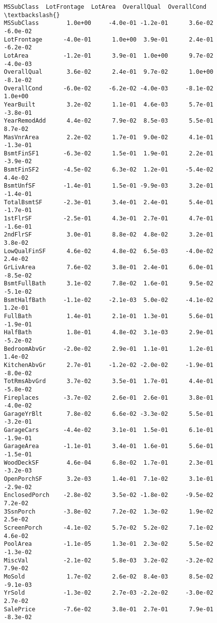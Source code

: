\documentclass[11pt]{article}
\begin{document}
    \begin{Verbatim}[commandchars=\\\{\}]
               MSSubClass  LotFrontage  LotArea  OverallQual  OverallCond  \textbackslash{}
MSSubClass        1.0e+00     -4.0e-01 -1.2e-01      3.6e-02     -6.0e-02   
LotFrontage      -4.0e-01      1.0e+00  3.9e-01      2.4e-01     -6.2e-02   
LotArea          -1.2e-01      3.9e-01  1.0e+00      9.7e-02     -4.0e-03   
OverallQual       3.6e-02      2.4e-01  9.7e-02      1.0e+00     -8.1e-02   
OverallCond      -6.0e-02     -6.2e-02 -4.0e-03     -8.1e-02      1.0e+00   
YearBuilt         3.2e-02      1.1e-01  4.6e-03      5.7e-01     -3.8e-01   
YearRemodAdd      4.4e-02      7.9e-02  8.5e-03      5.5e-01      8.7e-02   
MasVnrArea        2.2e-02      1.7e-01  9.0e-02      4.1e-01     -1.3e-01   
BsmtFinSF1       -6.3e-02      1.5e-01  1.9e-01      2.2e-01     -3.9e-02   
BsmtFinSF2       -4.5e-02      6.3e-02  1.2e-01     -5.4e-02      4.4e-02   
BsmtUnfSF        -1.4e-01      1.5e-01 -9.9e-03      3.2e-01     -1.4e-01   
TotalBsmtSF      -2.3e-01      3.4e-01  2.4e-01      5.4e-01     -1.7e-01   
1stFlrSF         -2.5e-01      4.3e-01  2.7e-01      4.7e-01     -1.6e-01   
2ndFlrSF          3.0e-01      8.8e-02  4.8e-02      3.2e-01      3.8e-02   
LowQualFinSF      4.6e-02      4.8e-02  6.5e-03     -4.0e-02      2.4e-02   
GrLivArea         7.6e-02      3.8e-01  2.4e-01      6.0e-01     -8.5e-02   
BsmtFullBath      3.1e-02      7.8e-02  1.6e-01      9.5e-02     -5.1e-02   
BsmtHalfBath     -1.1e-02     -2.1e-03  5.0e-02     -4.1e-02      1.2e-01   
FullBath          1.4e-01      2.1e-01  1.3e-01      5.6e-01     -1.9e-01   
HalfBath          1.8e-01      4.8e-02  3.1e-03      2.9e-01     -5.2e-02   
BedroomAbvGr     -2.0e-02      2.9e-01  1.1e-01      1.2e-01      1.4e-02   
KitchenAbvGr      2.7e-01     -1.2e-02 -2.0e-02     -1.9e-01     -8.0e-02   
TotRmsAbvGrd      3.7e-02      3.5e-01  1.7e-01      4.4e-01     -5.8e-02   
Fireplaces       -3.7e-02      2.6e-01  2.6e-01      3.8e-01     -4.0e-02   
GarageYrBlt       7.8e-02      6.6e-02 -3.3e-02      5.5e-01     -3.2e-01   
GarageCars       -4.4e-02      3.1e-01  1.5e-01      6.1e-01     -1.9e-01   
GarageArea       -1.1e-01      3.4e-01  1.6e-01      5.6e-01     -1.5e-01   
WoodDeckSF        4.6e-04      6.8e-02  1.7e-01      2.3e-01     -3.2e-03   
OpenPorchSF       3.2e-03      1.4e-01  7.1e-02      3.1e-01     -2.9e-02   
EnclosedPorch    -2.8e-02      3.5e-02 -1.8e-02     -9.5e-02      7.2e-02   
3SsnPorch        -3.8e-02      7.2e-02  1.3e-02      1.9e-02      2.5e-02   
ScreenPorch      -4.1e-02      5.7e-02  5.2e-02      7.1e-02      4.6e-02   
PoolArea         -1.1e-05      1.3e-01  2.3e-02      5.5e-02     -1.3e-02   
MiscVal          -2.1e-02      5.8e-03  3.2e-02     -3.2e-02      7.9e-02   
MoSold            1.7e-02      2.6e-02  8.4e-03      8.5e-02     -9.1e-03   
YrSold           -1.3e-02      2.7e-03 -2.2e-02     -3.0e-02      2.7e-02   
SalePrice        -7.6e-02      3.8e-01  2.7e-01      7.9e-01     -8.3e-02   


\end{Verbatim}
\end{document}
